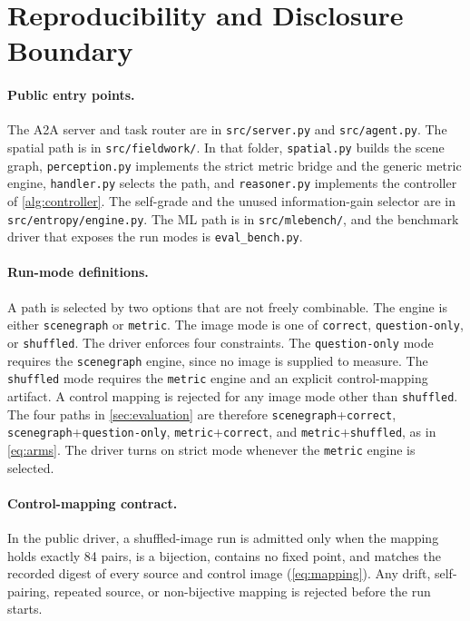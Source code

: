 \documentclass{article}
\begin{document}
\appendix
{}

\section{Reproducibility and Disclosure Boundary}
\label{sec:repro}

\paragraph{Public entry points.}
The A2A server and task router are in \texttt{src/server.py} and \texttt{src/agent.py}. The spatial path is in \texttt{src/fieldwork/}. In that folder, \texttt{spatial.py} builds the scene graph, \texttt{perception.py} implements the strict metric bridge and the generic metric engine, \texttt{handler.py} selects the path, and \texttt{reasoner.py} implements the controller of \cref{alg:controller}. The self-grade and the unused information-gain selector are in \texttt{src/entropy/engine.py}. The ML path is in \texttt{src/mlebench/}, and the benchmark driver that exposes the run modes is \texttt{eval\_bench.py}.

\paragraph{Run-mode definitions.}
A path is selected by two options that are not freely combinable. The engine is either \texttt{scenegraph} or \texttt{metric}. The image mode is one of \texttt{correct}, \texttt{question-only}, or \texttt{shuffled}. The driver enforces four constraints. The \texttt{question-only} mode requires the \texttt{scenegraph} engine, since no image is supplied to measure. The \texttt{shuffled} mode requires the \texttt{metric} engine and an explicit control-mapping artifact. A control mapping is rejected for any image mode other than \texttt{shuffled}. The four paths in \cref{sec:evaluation} are therefore \texttt{scenegraph}+\texttt{correct}, \texttt{scenegraph}+\texttt{question-only}, \texttt{metric}+\texttt{correct}, and \texttt{metric}+\texttt{shuffled}, as in \cref{eq:arms}. The driver turns on strict mode whenever the \texttt{metric} engine is selected.

\paragraph{Control-mapping contract.}
In the public driver, a shuffled-image run is admitted only when the mapping holds exactly 84 pairs, is a bijection, contains no fixed point, and matches the recorded digest of every source and control image (\cref{eq:mapping}). Any drift, self-pairing, repeated source, or non-bijective mapping is rejected before the run starts.
\end{document}
